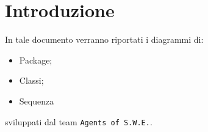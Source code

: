 \section{Introduzione}
In tale documento verranno riportati i diagrammi di:
\begin{itemize}
	\item Package;
	\item Classi;
	\item Sequenza
\end{itemize}
sviluppati dal team \texttt{Agents of S.W.E.}.